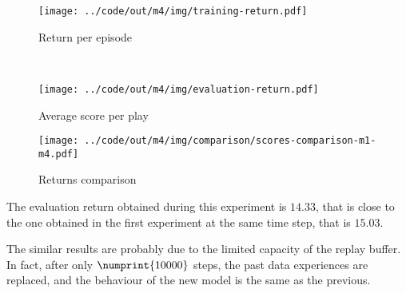 \documentclass[a4paper,12pt]{article} %
\begin{document}
	\begin{figure}[h]
		\begin{minipage}[b]{.49\textwidth}
			\centering
			\texttt{[image: ../code/out/m4/img/training-return.pdf]}	
			\caption{Return per episode}
			\label{fig:return-movingavg-m4}
		\end{minipage}
		~
		\begin{minipage}[b]{.49\textwidth}
			\centering
			\texttt{[image: ../code/out/m4/img/evaluation-return.pdf]}	
			\caption{Average score per play}
			\label{fig:score-m4}
		\end{minipage}
	\end{figure}

	\begin{figure}[H]
		\centering
		\texttt{[image: ../code/out/m4/img/comparison/scores-comparison-m1-m4.pdf]}	
		\caption{Returns comparison}
		\label{fig:score-m1-m4}
	\end{figure}
	
	The evaluation return obtained during this experiment is $14.33$, that is close to the one obtained in the first experiment at the same time step, that is $15.03$.
	
	The similar results are probably due to the limited capacity of the replay buffer. In fact, after only $\numprint{10000}$ steps, the past data experiences are replaced, and the behaviour of the new model is the same as the previous.
	
	
\end{document}

